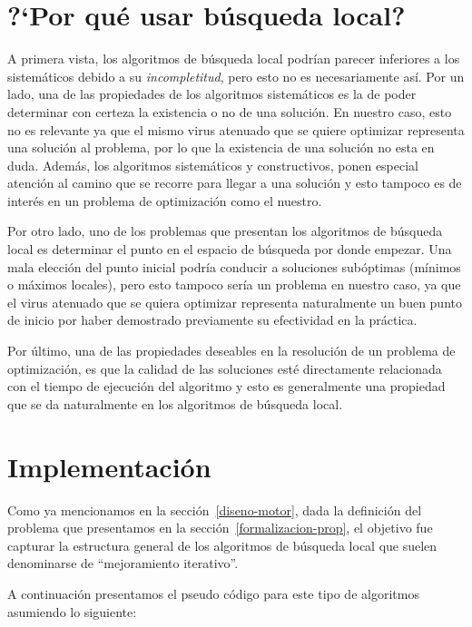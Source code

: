 \section{?`Por qu\'e usar b\'usqueda local?}

A primera vista, los algoritmos de b\'usqueda local podr\'ian parecer inferiores
a los sistem\'aticos debido a su \textit{incompletitud}, pero esto no es
necesariamente as\'i. Por un lado, una de las propiedades de los algoritmos
sistem\'aticos es la de poder determinar con certeza la existencia o no de una
soluci\'on. En nuestro caso, esto no es relevante ya que el mismo virus atenuado
que se quiere optimizar representa una soluci\'on al problema, por lo que la
existencia de una soluci\'on no esta en duda. Adem\'as, los algoritmos
sistem\'aticos y constructivos, ponen especial atenci\'on al camino que se
recorre para llegar a una soluci\'on y esto tampoco es de inter\'es en un
problema de optimizaci\'on como el nuestro.

Por otro lado, uno de los problemas que presentan los algoritmos de b\'usqueda
local es determinar el punto en el espacio de b\'usqueda por donde empezar. Una
mala elecci\'on del punto inicial podr\'ia conducir a soluciones sub\'optimas
(m\'inimos o m\'aximos locales), pero esto tampoco ser\'ia un problema en
nuestro caso, ya que el virus atenuado que se quiera optimizar representa
naturalmente un buen punto de inicio por haber demostrado previamente su
efectividad en la pr\'actica.

Por \'ultimo, una de las propiedades deseables en la resoluci\'on de un
problema de optimizaci\'on, es que la calidad de las soluciones est\'e
directamente relacionada con el tiempo de ejecuci\'on del algoritmo y esto es
generalmente una propiedad que se da naturalmente en los algoritmos de
b\'usqueda local.

\section{Implementaci\'on}

Como ya mencionamos en la secci\'on~\ref{diseno-motor}, dada la definici\'on
del problema que presentamos en la secci\'on~\ref{formalizacion-prop}, el
objetivo fue capturar la estructura general de los algoritmos de
b\'usqueda local que suelen denominarse de ``mejoramiento iterativo''.

A continuaci\'on presentamos el pseudo c\'odigo para este tipo de algoritmos
asumiendo lo siguiente:

